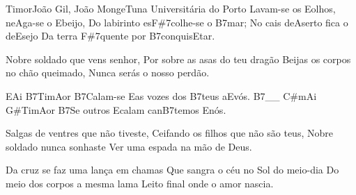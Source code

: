 \begin{musica}{Timor}{João Gil, João Monge}{Tuna Universitária do Porto}
Lavam-se os \ac{E}{o}lhos, ne\ac{A}{ga}-se o \ac{E}{bei}jo,
Do labirinto es\ac{F#7}{co}lhe-se o \ac{B7}{mar};
No cais de\ac{A}{ser}to fica o de\ac{E}{se}jo
Da terra \ac{F#7}{quen}te por \ac{B7}{con}quis\ac{E}{tar}.

Nobre soldado que vens senhor,
Por sobre as asas do teu dragão
Beijas os corpos no chão queimado,
Nunca serás o nosso perdão.

\ac{E}{Ai} \ac{B7}{Ti}m\ac{A}{or}
\ac{B7}{Ca}lam-se \ac{E}{as} vozes dos \ac{B7}{teus} a\ac{E}{vós}. \ac{B7}{}__
\ac{C#m}{Ai} \ac{G#}{Ti}m\ac{A}{or}
\ac{B7}{Se} outros \ac{E}{ca}lam can\ac{B7}{te}mos \ac{E}{nós}.

Salgas de ventres que não tiveste,
Ceifando os filhos que não são teus,
Nobre soldado nunca sonhaste
Ver uma espada na mão de Deus.

Da cruz se faz uma lança em chamas
Que sangra o céu no Sol do meio-dia
Do meio dos corpos a mesma lama
Leito final onde o amor nascia.


\end{musica}
